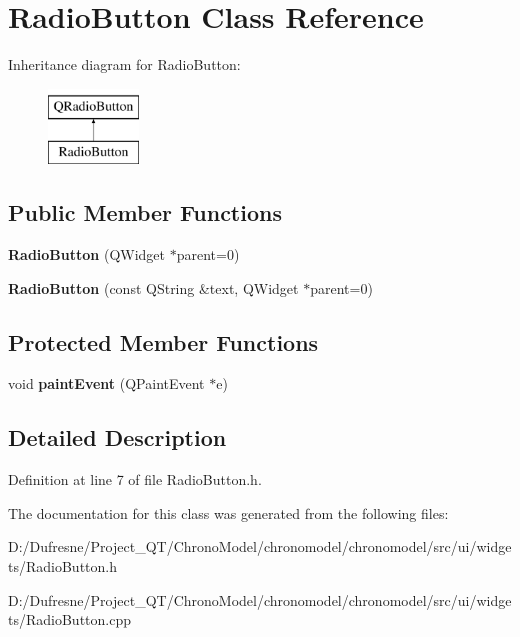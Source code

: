 \hypertarget{class_radio_button}{\section{Radio\-Button Class Reference}
\label{class_radio_button}
}
Inheritance diagram for Radio\-Button\-:\begin{figure}[H]
\begin{center}
\leavevmode
\includegraphics[height=2.000000cm]{class_radio_button}
\end{center}
\end{figure}
\subsection*{Public Member Functions}
\begin{DoxyCompactItemize}
\item 
\hypertarget{class_radio_button_a657f5d52085a4c42bba66e2934c50549}{{\bfseries Radio\-Button} (Q\-Widget $\ast$parent=0)}\label{class_radio_button_a657f5d52085a4c42bba66e2934c50549}

\item 
\hypertarget{class_radio_button_a442190324715b2ab0e0cd9e41729fe88}{{\bfseries Radio\-Button} (const Q\-String \&text, Q\-Widget $\ast$parent=0)}\label{class_radio_button_a442190324715b2ab0e0cd9e41729fe88}

\end{DoxyCompactItemize}
\subsection*{Protected Member Functions}
\begin{DoxyCompactItemize}
\item 
\hypertarget{class_radio_button_a2d3aa4b92b5a9d53c3d3173a826a8d19}{void {\bfseries paint\-Event} (Q\-Paint\-Event $\ast$e)}\label{class_radio_button_a2d3aa4b92b5a9d53c3d3173a826a8d19}

\end{DoxyCompactItemize}


\subsection{Detailed Description}


Definition at line 7 of file Radio\-Button.\-h.



The documentation for this class was generated from the following files\-:\begin{DoxyCompactItemize}
\item 
D\-:/\-Dufresne/\-Project\-\_\-\-Q\-T/\-Chrono\-Model/chronomodel/chronomodel/src/ui/widgets/Radio\-Button.\-h\item 
D\-:/\-Dufresne/\-Project\-\_\-\-Q\-T/\-Chrono\-Model/chronomodel/chronomodel/src/ui/widgets/Radio\-Button.\-cpp\end{DoxyCompactItemize}
